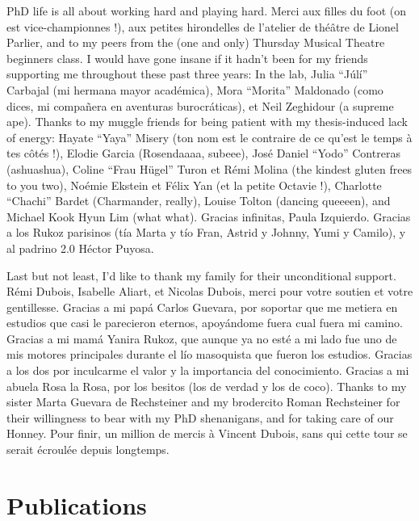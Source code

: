 \documentclass[12pt, twoside]{report}
\begin{document}
PhD life is all about working hard and playing hard. Merci aux filles du foot (on est vice-championnes !), aux petites hirondelles de l'atelier de théâtre de Lionel Parlier, and to my peers from the (one and only) Thursday Musical Theatre beginners class. I would have gone insane if it hadn't been for my friends supporting me throughout these past three years: In the lab, Julia ``Júlí'' Carbajal (mi hermana mayor académica), Mora ``Morita'' Maldonado (como dices, mi compañera en aventuras burocráticas), et Neil Zeghidour (a supreme ape).  Thanks to my muggle friends for being patient with my thesis-induced lack of energy: Hayate ``Yaya'' Misery (ton nom est le contraire de ce qu'est le temps à tes côtés !), Elodie Garcia (Rosendaaaa, subeee), José Daniel ``Yodo'' Contreras (ashuashua), Coline ``Frau Hügel'' Turon et Rémi Molina (the kindest gluten frees to you two), Noémie Ekstein et Félix Yan (et la petite Octavie !), Charlotte ``Chachi'' Bardet (Charmander, really), Louise Tolton (dancing queeeen), and Michael Kook Hyun Lim (what what). Gracias infinitas, Paula Izquierdo. Gracias a los Rukoz parisinos (tía Marta y tío Fran, Astrid y Johnny, Yumi y Camilo), y al padrino 2.0 Héctor Puyosa.   

Last but not least, I'd like to thank my family for their unconditional support. Rémi Dubois, Isabelle Aliart, et Nicolas Dubois, merci pour votre soutien et votre gentillesse. Gracias a mi papá Carlos Guevara, por soportar que me metiera en estudios que casi le parecieron eternos, apoyándome fuera cual fuera mi camino. Gracias a mi mamá Yanira Rukoz, que aunque ya no esté a mi lado fue uno de mis motores principales durante el lío masoquista que fueron los estudios. Gracias a los dos por inculcarme el valor y la importancia del conocimiento. Gracias a mi abuela Rosa la Rosa, por los besitos (los de verdad y los de coco). Thanks to my sister Marta Guevara de Rechsteiner and my brodercito Roman Rechsteiner for their willingness to bear with my PhD shenanigans, and for taking care of our Honney. Pour finir, un million de mercis à Vincent Dubois, sans qui cette tour se serait écroulée depuis longtemps.              
  
\chapter*{Publications}
\end{document}
